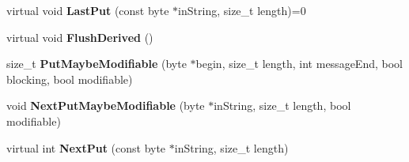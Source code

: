 \begin{DoxyCompactItemize}
\item 
\hypertarget{class_filter_with_buffered_input_a95f02a7f1726c37082be43a53bf199f2}{
virtual void {\bfseries LastPut} (const byte $\ast$inString, size\_\-t length)=0}
\label{class_filter_with_buffered_input_a95f02a7f1726c37082be43a53bf199f2}

\item 
\hypertarget{class_filter_with_buffered_input_a36d688fc691d1c5f2b62cfa2139145bb}{
virtual void {\bfseries FlushDerived} ()}
\label{class_filter_with_buffered_input_a36d688fc691d1c5f2b62cfa2139145bb}

\item 
\hypertarget{class_filter_with_buffered_input_acbf05087d2d0a2c6b517574bff2c47e3}{
size\_\-t {\bfseries PutMaybeModifiable} (byte $\ast$begin, size\_\-t length, int messageEnd, bool blocking, bool modifiable)}
\label{class_filter_with_buffered_input_acbf05087d2d0a2c6b517574bff2c47e3}

\item 
\hypertarget{class_filter_with_buffered_input_ae6a9cf2b33f00384457a8d8644059836}{
void {\bfseries NextPutMaybeModifiable} (byte $\ast$inString, size\_\-t length, bool modifiable)}
\label{class_filter_with_buffered_input_ae6a9cf2b33f00384457a8d8644059836}

\item 
\hypertarget{class_filter_with_buffered_input_a36ba831e92c9c7d46ffd0df853da6a2e}{
virtual int {\bfseries NextPut} (const byte $\ast$inString, size\_\-t length)}
\label{class_filter_with_buffered_input_a36ba831e92c9c7d46ffd0df853da6a2e}

\end{DoxyCompactItemize}
